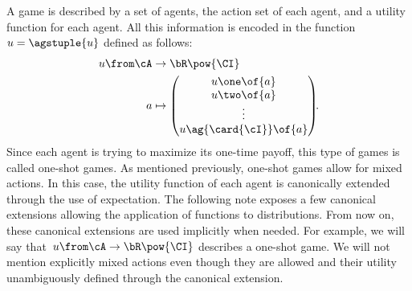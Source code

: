 A game is described by a set of agents, the action set of each agent, and a utility function for each agent.
All this information is encoded in the function~\(u = \agstuple{u}\) defined as follows:
\[
\begin{aligned}
u \from \cA &\to \bR\pow{\CI} \\
a &\mapsto
\begin{pmatrix}
u\one \of{a} \\
u\two \of{a} \\
\vdots \\
u\ag{\card{\cI}} \of {a}
\end{pmatrix}\!\!.
\end{aligned}
\]
Since each agent is trying to maximize its one-time payoff, this type of games is called one-shot games.
As mentioned previously, one-shot games allow for mixed actions.
In this case, the utility function of each agent is canonically extended through the use of expectation.
The following note exposes a few canonical extensions allowing the application of functions to distributions.
From now on, these canonical extensions are used implicitly when needed.
For example, we will say that~\(u \from \cA \to \bR\pow{\CI}\) describes a one-shot game.
We will not mention explicitly mixed actions even though they are allowed and their utility unambiguously defined through the canonical extension.

